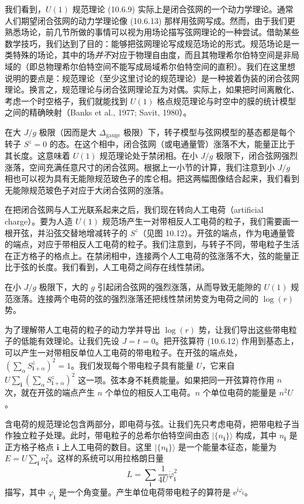 我们看到，$U(1)$ 规范理论 (10.6.9) 实际上是闭合弦网的一个动力学理论。通常人们期望闭合弦网的动力学理论像 (10.6.13) 那样用弦网写成。然而，由于我们更熟悉场论，前几节所做的事情可以视为用场论描写弦网理论的一种尝试。借助某些数学技巧，我们达到了目的：能够把弦网理论写成规范场论的形式。规范场论是一类特殊的场论，其中的场\emph{并不}对应于物理自由度，而且其物理希尔伯特空间是非局域的（即总物理希尔伯特空间不能写成局域希尔伯特空间的直积）。我们在这里想说明的要点是：规范理论（至少这里讨论的规范理论）是一种披着伪装的闭合弦网理论。换言之，规范理论与闭合弦网理论互为对偶。实际上，如果把时间离散化、考虑一个时空格子，我们就能找到 $U(1)$ 格点规范理论与时空中的膜的统计模型之间的精确映射（Banks et al., 1977; Savit, 1980）。

在大 $J/g$ 极限（因而是大 $\Delta_{\mathrm{gauge}}$ 极限）下，转子模型与弦网模型的基态都是每个转子 $S^{z}=0$ 的态。在这个相中，闭合弦网（或电通量管）涨落不大，能量正比于其长度。这意味着 $U(1)$ 规范理论处于禁闭相。在小 $J/g$ 极限下，闭合弦网强烈涨落，空间充满任意尺寸的闭合弦网。根据上一小节的计算，我们注意到小 $J/g$ 相也可以视为具有无能隙规范玻色子的库仑相。把这两幅图像结合起来，我们看到无能隙规范玻色子对应于大闭合弦网的涨落。

在把闭合弦网与人工光联系起来之后，我们现在转向人工电荷（artificial charge）。要为人造 $U(1)$ 规范场产生一对带相反人工电荷的粒子，我们需要画一根开弦，并沿弦交替地增减转子的 $S^{z}$（见图 10.12）。开弦的端点，作为电通量管的端点，对应于带相反人工电荷的粒子。我们注意到，与转子不同，带电粒子生活在正方格子的格点上。在禁闭相中，连接两个人工电荷的弦涨落不大，弦的能量正比于弦的长度。我们看到，人工电荷之间存在线性禁闭。

在小 $J/g$ 极限下，大的 $g$ 引起闭合弦网的强烈涨落，从而导致无能隙的 $U(1)$ 规范涨落。连接两个电荷的弦的强烈涨落还把线性禁闭势变为电荷之间的 $\log(r)$ 势。

为了理解带人工电荷的粒子的动力学并导出 $\log(r)$ 势，让我们导出这些带电粒子的低能有效理论。让我们先设 $J=t=0$。把开弦算符 (10.6.12) 作用到基态上，可以产生一对带相反单位人工电荷的带电粒子。在开弦的端点处，$(\sum_{\alpha}S^{z}_{\pmb i+\alpha})^{2}=1$。我们发现每个带电粒子具有能量 $U$，它来自 $U\sum_{\pmb i}(\sum_{\alpha}S^{z}_{\pmb i+\alpha})^{2}$ 这一项。弦本身不耗费能量。如果把同一开弦算符作用 $n$ 次，就在开弦的端点产生 $n$ 个单位的相反人工电荷。$n$ 个单位电荷的能量是 $n^{2}U$。

含电荷的规范理论包含两部分，即电荷与弦。让我们先只考虑电荷，把带电粒子当作独立粒子处理。此时，带电粒子的总希尔伯特空间由态 $|\{n_{\pmb i}\}\rangle$ 构成，其中 $n_{\pmb i}$ 是正方格子格点 $\pmb i$ 上人工电荷的数目。这里 $|\{n_{\pmb i}\}\rangle$ 是一个能量本征态，能量为 $E=U\sum_{\pmb i}n^{2}_{\pmb i}$。这样的系统可以用拉格朗日量
\begin{equation*}
L=\sum_{\pmb i}\frac{1}{4U}\dot{\varphi}^{2}_{\pmb i}\tag{10.6.14}
\end{equation*}
描写，其中 $\varphi_{\pmb i}$ 是一个角变量。产生单位电荷带电粒子的算符是 $\mathrm{e}^{\mathrm{i}\varphi_{\pmb i}}$。

